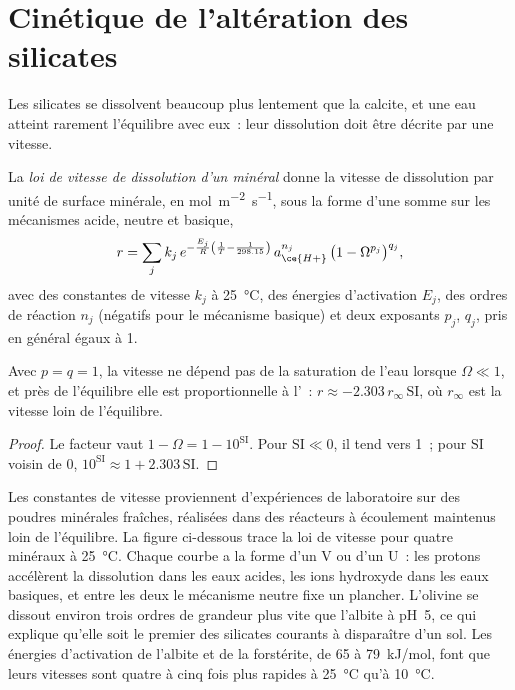 \section{Cinétique de l'altération des silicates}\label{sec:b3:water-rock-interaction:kinetics}

Les silicates se dissolvent beaucoup plus lentement que la calcite, et une eau atteint rarement
l'équilibre avec eux~: leur dissolution doit être décrite par une vitesse.

\begin{definition}\label{def:b3:water-rock-interaction:rate-law}
La \emph{loi de vitesse de dissolution d'un minéral}
donne la vitesse de dissolution par unité de surface minérale, en
\unit{mol.m^{-2}.s^{-1}}, sous la forme d'une somme sur les mécanismes acide, neutre et basique,
\[
r = \sum_j k_j\,e^{-\frac{E_j}{R}\left(\frac1T - \frac1{298.15}\right)}\,
a_{\ce{H+}}^{n_j}\,\bigl(1 - \Omega^{p_j}\bigr)^{q_j},
\]
avec des constantes de vitesse $k_j$ à \qty{25}{\celsius}, des énergies d'activation $E_j$,
des ordres de réaction $n_j$ (négatifs pour le mécanisme basique) et deux exposants
$p_j$, $q_j$, pris en général égaux à 1.
\end{definition}

\begin{proposition}\label{prop:b3:water-rock-interaction:affinity}
Avec $p = q = 1$, la vitesse ne dépend pas de la saturation de l'eau
lorsque $\Omega \ll 1$, et près de l'équilibre elle est proportionnelle à
l'~: $r \approx -2.303\,r_\infty\,\mathrm{SI}$, où
$r_\infty$ est la vitesse loin de l'équilibre.
\end{proposition}

\begin{proof}
Le facteur vaut $1 - \Omega = 1 - 10^{\mathrm{SI}}$. Pour $\mathrm{SI} \ll 0$, il
tend vers 1~; pour $\mathrm{SI}$ voisin de 0, $10^{\mathrm{SI}} \approx 1 +
2.303\,\mathrm{SI}$.
\end{proof}

Les constantes de vitesse proviennent d'expériences de laboratoire sur des poudres minérales fraîches,
réalisées dans des réacteurs à écoulement maintenus loin de l'équilibre. La figure ci-dessous trace
la loi de vitesse pour quatre minéraux à \qty{25}{\celsius}. Chaque courbe a la forme d'un V ou d'un U~:
les protons accélèrent la dissolution dans les eaux acides, les ions hydroxyde dans les eaux basiques, et
entre les deux le mécanisme neutre fixe un plancher. L'olivine se dissout environ trois ordres de grandeur
plus vite que l'albite à pH~5, ce qui explique qu'elle soit le premier des silicates courants à disparaître
d'un sol. Les énergies d'activation de l'albite et de la forstérite, de 65 à
\qty{79}{kJ/mol}, font que leurs vitesses sont quatre à cinq
fois plus rapides à \qty{25}{\celsius} qu'à \qty{10}{\celsius}.


